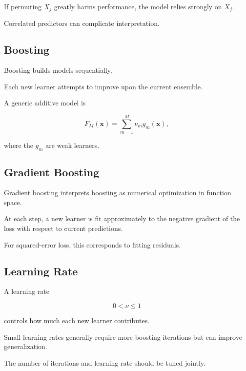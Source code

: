 If permuting \(X_j\) greatly harms performance, the model relies strongly
on \(X_j\).

Correlated predictors can complicate interpretation.

\subsection{Boosting}
\label{subsec:boosting}

Boosting builds models sequentially.

Each new learner attempts to improve upon the current ensemble.

A generic additive model is

\[
\boxed{
F_M(\mathbf{x})
=
\sum_{m=1}^{M}
\nu_m
g_m(\mathbf{x}),
}
\]

where the \(g_m\) are weak learners.

\subsection{Gradient Boosting}
\label{subsec:gradient-boosting}

Gradient boosting interprets boosting as numerical optimization in
function space.

At each step, a new learner is fit approximately to the negative gradient
of the loss with respect to current predictions.

For squared-error loss, this corresponds to fitting residuals.

\subsection{Learning Rate}
\label{subsec:boosting-learning-rate}

A learning rate

\[
\boxed{
0<\nu\leq1
}
\]

controls how much each new learner contributes.

Small learning rates generally require more boosting iterations but can
improve generalization.

The number of iterations and learning rate should be tuned jointly.

